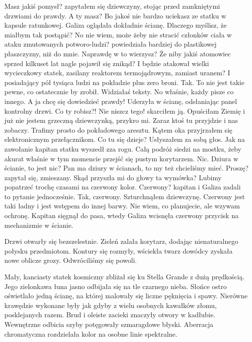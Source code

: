 \begin{dialogue}
	\ds{} Masz jakiś pomysł? \dm{} zapytałem się dziewczyny, stojąc przed zamkniętymi drzwiami do prawdy.
	\ds{} A ty masz? Bo jakoś nie bardzo uciekasz ze statku w kapsule ratunkowej. \dm{} Galiza oglądała dokładnie ścianę.
	\ds{} Dlaczego myślisz, że miałbym tak postąpić?
	\ds{} No nie wiem, może żeby nie stracić członków ciała w ataku zmutowanych potworo-ludzi? \dm{} powiedziała bardziej do plastikowej płaszczyzny, niż do mnie.
	\ds{} Naprawdę w to wierzysz? Że niby jakiś atomowiec sprzed kilkuset lat nagle pojawił się znikąd? I będzie atakował wielki wycieczkowy statek, zasilany reaktorem termojądrowym, zamiast uranem?
	\ds{} I posiadający pół tysiąca ludzi na pokładzie plus zero broni. Tak.
	\ds{} To nie jest takie pewne, co ostatecznie by zrobił. Widziałaś teksty.
	\ds{} No właśnie, każdy pisze co innego. A ja chcę się dowiedzieć prawdy! \dm{} Uderzyła w ścianę, odsłaniając panel kontrolny drzwi.
	\ds{} Co ty robisz?! Nie niszcz tego! \dm{} skarciłem ją.
	\ds{} Opuściłam Ziemię i już nie jestem grzeczną dziewczynką, przykro mi.
	\ds{} Zaraz ktoś tu przyjdzie i nas zobaczy. Trafimy prosto do pokładowego aresztu. \dm{} Kątem oka przyjrzałem się elektronicznym przełącznikom.
	\ds{} Co tu się dzieje? \dm{} Usłyszałem za sobą głos. Jak na zawołanie kapitan statku wyszedł zza rogu. Całą podróż siedzi na mostku, żeby akurat właśnie w tym momencie przejść się pustym korytarzem.
	\ds{} Nic.
	\ds{} Dziura w ścianie, to jest nic?
	\ds{} Pan ma dziury w ścianach, to my też chcieliśmy mieć.
	\ds{} Proszę? \dm{} zapytał się, zmieszany. Skąd przyszła mi do głowy ta wymówka?
	\ds{} Lubimy popatrzeć trochę czasami na czerwony kolor.
	\ds{} Czerwony? \dm{} kapitan i Galiza zadali to pytanie jednocześnie.
	\ds{} Tak, czerwony. \dm{} Szturchnąłem dziewczynę. \dm{} Czerwony jest taki ładny i jest wstępem do innej barwy.
	\ds{} Nie wiem, co planujecie, ale wzywam ochronę. \dm{} Kapitan sięgnął do pasa, wtedy Galiza wcisnęła czerwony przycisk na mechanizmie w ścianie.
\end{dialogue}

Drzwi otwarły się bezszelestnie.
Zieleń zalała korytarz, dodając nienaturalnego połysku przedmiotom.
Kontury się rozmyły, wściekła twarz dowódcy zyskała nowe oblicze grozy.
Odwróciliśmy się powoli.

Mały, kanciasty statek kosmiczny zbliżał się ku Stella Grande z dużą prędkością.
Jego zielonkawa łuna jasno odbijała się na tle czarnego nieba.
Słońce ostro oświetlało jedną ścianę, na której malowały się liczne pęknięcia i spawy.
Nierówne krawędzie wykonane były jak gdyby z wielu osobnych kawałków złomu, posklejanych razem.
Brud i oleiste zacieki znaczyły otwory w kadłubie.
Wewnętrzne odbicia szyby potęgowały szmaragdowe błyski.
Aberracja chromatyczna rozdzielała kolor na osobne linie spektralne.

